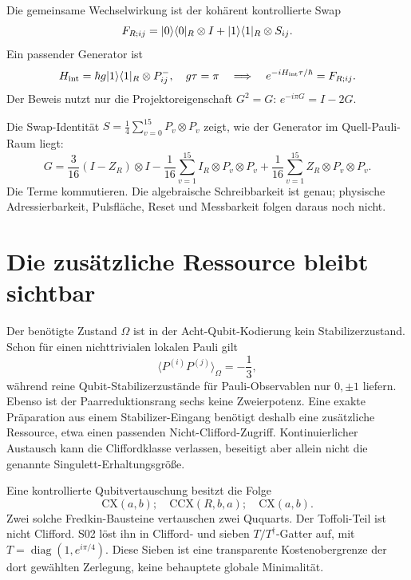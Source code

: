Die gemeinsame Wechselwirkung ist der kohärent kontrollierte Swap
\begin{equation}
F_{R;ij}=\lvert0\rangle\langle0\rvert_R\otimes I+\lvert1\rangle\langle1\rvert_R\otimes S_{ij}.
\end{equation}
Ein passender Generator ist
\begin{equation}
H_{\mathrm{int}}=\hbar g\lvert1\rangle\langle1\rvert_R\otimes P^-_{ij},\quad
g\tau=\pi\quad\Longrightarrow\quad e^{-iH_{\mathrm{int}}\tau/\hbar}=F_{R;ij}.
\end{equation}
Der Beweis nutzt nur die Projektoreigenschaft $G^2=G$: $e^{-i\pi G}=I-2G$.

Die Swap-Identität $S=\frac14\sum_{v=0}^{15}P_v\otimes P_v$ zeigt, wie der Generator im Quell-Pauli-Raum liegt:
\begin{equation}
G=\frac3{16}(I-Z_R)\otimes I
-\frac1{16}\sum_{v=1}^{15}I_R\otimes P_v\otimes P_v
+\frac1{16}\sum_{v=1}^{15}Z_R\otimes P_v\otimes P_v.
\end{equation}
Die Terme kommutieren. Die algebraische Schreibbarkeit ist genau; physische Adressierbarkeit, Pulsfläche, Reset und Messbarkeit folgen daraus noch nicht.

\section{Die zusätzliche Ressource bleibt sichtbar}
Der benötigte Zustand $\Omega$ ist in der Acht-Qubit-Kodierung kein Stabilizerzustand. Schon für einen nichttrivialen lokalen Pauli gilt
\begin{equation}
\langle P^{(i)}P^{(j)}\rangle_\Omega=-\frac13,
\end{equation}
während reine Qubit-Stabilizerzustände für Pauli-Observablen nur $0,\pm1$ liefern. Ebenso ist der Paarreduktionsrang sechs keine Zweierpotenz. Eine exakte Präparation aus einem Stabilizer-Eingang benötigt deshalb eine zusätzliche Ressource, etwa einen passenden Nicht-Clifford-Zugriff. Kontinuierlicher Austausch kann die Cliffordklasse verlassen, beseitigt aber allein nicht die genannte Singulett-Erhaltungsgröße.

Eine kontrollierte Qubitvertauschung besitzt die Folge
\begin{equation}
\mathrm{CX}(a,b);\quad \mathrm{CCX}(R,b,a);\quad\mathrm{CX}(a,b).
\end{equation}
Zwei solche Fredkin-Bausteine vertauschen zwei Ququarts. Der Toffoli-Teil ist nicht Clifford. S02 löst ihn in Clifford- und sieben $T/T^\dagger$-Gatter auf, mit $T=\operatorname{diag}(1,e^{i\pi/4})$. Diese Sieben ist eine transparente Kostenobergrenze der dort gewählten Zerlegung, keine behauptete globale Minimalität.

